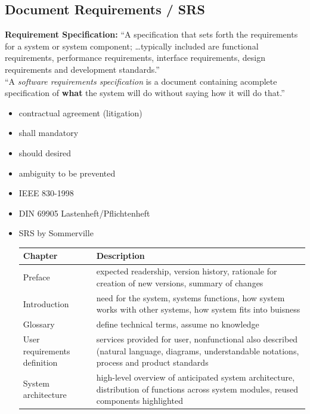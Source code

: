 \documentclass[a4paper, 10pt]{article}
\begin{document}
\subsection*{Document Requirements / SRS}
\begin{shaded}
\textbf{Requirement Specification:} ``A specification that sets forth the
requirements for a system or system component; \dots typically included
are functional requirements, performance requirements, interface
requirements, design requirements and development standards.'' \\
``A \emph{software requirements specification} is a document containing acomplete specification of \textbf{what} the system will do without saying how it will do that.''
\end{shaded}
\begin{itemize}
	\item contractual agreement (\follows litigation)
	\item shall \follows mandatory
	\item should \follows desired
	\item ambiguity \follows to be prevented
	\item IEEE 830-1998
	\item DIN 69905 Lastenheft/Pflichtenheft
	\item SRS by Sommerville \\
	\begin{tabular}{|p{3cm}|p{8cm}|}
	\hline %
	\textbf{Chapter} & \textbf{Description} \\
	\hline %
	Preface & expected readership, version history, rationale for creation of new versions, summary of changes \\
	\hline %
	Introduction & need for the system, systems functions, how system works with other systems, how system fits into buisness \\
	\hline %
	Glossary & define technical terms, assume no knowledge \\
	\hline %
	User requirements definition & services provided for user, nonfunctional also described (natural language, diagrams, understandable notations, process and product standards \\
	\hline %
	System architecture & high-level overview of anticipated system architecture, distribution of functions across system modules, reused components highlighted \\

\end{tabular}
\end{itemize}
\end{document}
